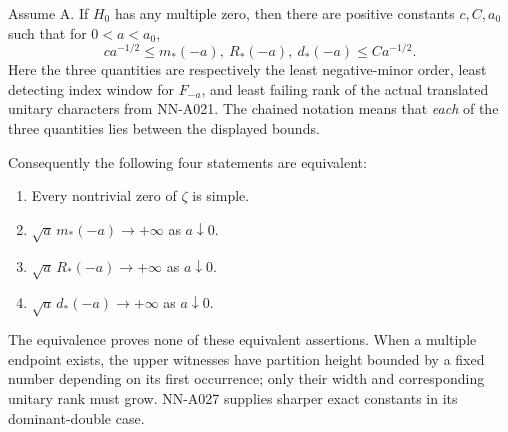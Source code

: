 \begin{theorem}
\label{thm:analytic-simplicity-detection-equivalence}
Assume A. If $H_0$ has any multiple zero, then there are positive
constants $c,C,a_0$ such that for $0<a<a_0$,
\begin{equation}\label{eq:analytic-any-multiple-detection-scale}
 c a^{-1/2}\le m_*(-a),\ R_*(-a),\ d_*(-a)\le C a^{-1/2}.
\end{equation}
Here the three quantities are respectively the least negative-minor
order, least detecting index window for $F_{-a}$, and least failing
rank of the actual translated unitary characters from NN-A021.
The chained notation means that \emph{each} of the three quantities
lies between the displayed bounds.

Consequently the following four statements are equivalent:
\begin{enumerate}
\item Every nontrivial zero of $\zeta$ is simple.
\item $\sqrt a\,m_*(-a)\longrightarrow+\infty$ as $a\downarrow0$.
\item $\sqrt a\,R_*(-a)\longrightarrow+\infty$ as $a\downarrow0$.
\item $\sqrt a\,d_*(-a)\longrightarrow+\infty$ as $a\downarrow0$.
\end{enumerate}
The equivalence proves none of these equivalent assertions.
When a multiple endpoint exists, the upper witnesses have partition
height bounded by a fixed number depending on its first occurrence;
only their width and corresponding unitary rank must grow.
NN-A027 supplies sharper exact constants in its dominant-double case.
\end{theorem}

